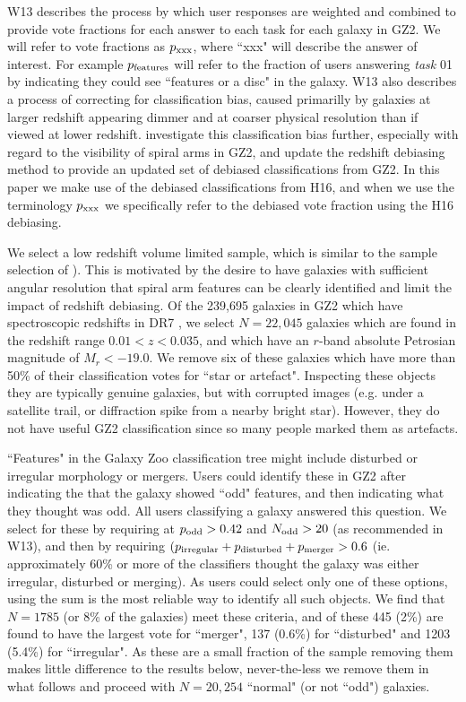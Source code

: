 \documentclass[usenatbib]{mn2e}
\begin{document}
W13 describes the process by which user responses are weighted and combined to provide vote fractions for each answer to each task for each galaxy in GZ2. We will refer to vote fractions as $p_{\rm xxx}$, where ``xxx" will describe the answer of interest. For example $p_{\rm features}$ will refer to the fraction of users answering {\it task} 01 by indicating they could see ``features or a disc" in the galaxy. W13 also describes a process of correcting for classification bias, caused primarilly by galaxies at larger redshift appearing dimmer and at coarser physical resolution than if viewed at lower redshift. \citet[hereafter H16]{Hart2016} investigate this classification bias further, especially with regard to the visibility of spiral arms in GZ2, and update the redshift debiasing method to provide an updated set of debiased classifications from GZ2. In this paper we make use of the debiased classifications from H16, and when we use the terminology $p_{\rm xxx}$ we specifically refer to the debiased vote fraction using the H16 debiasing.

We select a low redshift volume limited sample, which is similar to the sample selection of \citep{Hart2016, Hart2017}). This is motivated by the desire to have galaxies with sufficient angular resolution that spiral arm features can be clearly identified and limit the impact of redshift debiasing. Of the {239,695} galaxies in GZ2 which have spectroscopic redshifts in DR7 \citep{DR7,Strauss2002}, we select $N=22,045$  galaxies which are found in the redshift range $0.01<z<0.035$, and which have an $r$-band absolute Petrosian magnitude of $M_r < -19.0$. We remove {six} of these galaxies which have more than 50\% of their classification votes for ``star or artefact". Inspecting these objects they are typically genuine galaxies, but with corrupted images (e.g. under a satellite trail, or diffraction spike from a nearby bright star). However, they do not have useful GZ2 classification since so many people marked them as artefacts.

``Features" in the Galaxy Zoo classification tree might include disturbed or irregular morphology or mergers. Users could identify these in GZ2 after indicating the that the galaxy showed ``odd" features, and then indicating what they thought was odd. All users classifying a galaxy answered this question. We select for these by requiring at $p_{\rm odd} > 0.42$ and $N_{\rm odd}>20$ (as recommended in W13), and then by requiring $(p_{\rm irregular}+p_{\rm disturbed} + p_{\rm merger} > 0.6$ (ie. approximately 60\% or more of the classifiers thought the galaxy was either irregular, disturbed or merging). As users could select only one of these options, using the sum is the most reliable way to identify all such objects. We find that {$N=1785$ (or 8\% of  the galaxies) meet these criteria, and of these 445 (2\%) are found to have the largest vote for ``merger", 137 (0.6\%)  for ``disturbed" and 1203 (5.4\%) for ``irregular"}. As these are a small fraction of the sample removing them makes little difference to the results below, never-the-less we remove them in what follows and proceed with {$N=20,254$} ``normal" (or not ``odd") galaxies. 
\end{document}

